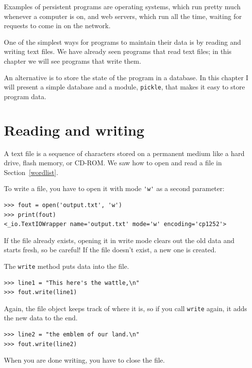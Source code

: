 \documentclass[10pt]{book}
\begin{document}
Examples of persistent programs are operating systems, which
run pretty much whenever a computer is on, and web servers,
which run all the time, waiting for requests to come in on
the network.

One of the simplest ways for programs to maintain their data
is by reading and writing text files.  We have already seen
programs that read text files; in this chapter we will see programs
that write them.

An alternative is to store the state of the program in a database.
In this chapter I will present a simple database and a module,
{\tt pickle}, that makes it easy to store program data.



\section{Reading and writing}


A text file is a sequence of characters stored on a permanent
medium like a hard drive, flash memory, or CD-ROM.  We saw how
to open and read a file in Section~\ref{wordlist}.


To write a file, you have to open it with mode
\verb"'w'" as a second parameter:

\beforeverb
\begin{verbatim}
>>> fout = open('output.txt', 'w')
>>> print(fout)
<_io.TextIOWrapper name='output.txt' mode='w' encoding='cp1252'>
\end{verbatim}
\afterverb
%
If the file already exists, opening it in write mode clears out
the old data and starts fresh, so be careful!
If the file doesn't exist, a new one is created.

The {\tt write} method puts data into the file.

\beforeverb
\begin{verbatim}
>>> line1 = "This here's the wattle,\n"
>>> fout.write(line1)
\end{verbatim}
\afterverb
%
Again, the file object keeps track of where it is, so if
you call {\tt write} again, it adds the new data to the end.

\beforeverb
\begin{verbatim}
>>> line2 = "the emblem of our land.\n"
>>> fout.write(line2)
\end{verbatim}
\afterverb
%
When you are done writing, you have to close the file.
\end{document}
